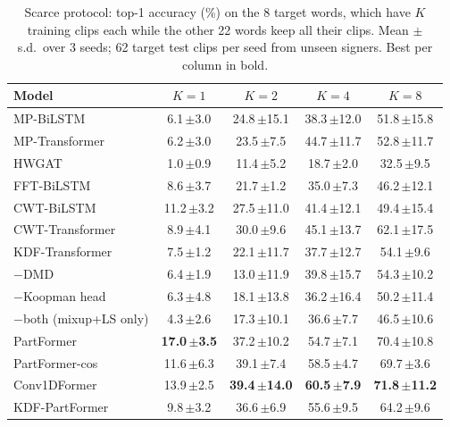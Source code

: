 \begin{table}[t]
\centering
\small
\caption{Scarce protocol: top-1 accuracy (\%) on the 8 target words, which have $K$ training clips each while the other 22 words keep all their clips. Mean $\pm$ s.d.\ over 3 seeds; 62 target test clips per seed from unseen signers. Best per column in bold.}
\label{tab:scarce}
\begin{tabular}{lcccc}
\toprule
Model & $K=1$ & $K=2$ & $K=4$ & $K=8$ \\
\midrule
MP-BiLSTM & 6.1\,{\scriptsize$\pm$3.0} & 24.8\,{\scriptsize$\pm$15.1} & 38.3\,{\scriptsize$\pm$12.0} & 51.8\,{\scriptsize$\pm$15.8} \\
MP-Transformer & 6.2\,{\scriptsize$\pm$3.0} & 23.5\,{\scriptsize$\pm$7.5} & 44.7\,{\scriptsize$\pm$11.7} & 52.8\,{\scriptsize$\pm$11.7} \\
\midrule
HWGAT & 1.0\,{\scriptsize$\pm$0.9} & 11.4\,{\scriptsize$\pm$5.2} & 18.7\,{\scriptsize$\pm$2.0} & 32.5\,{\scriptsize$\pm$9.5} \\
\midrule
FFT-BiLSTM & 8.6\,{\scriptsize$\pm$3.7} & 21.7\,{\scriptsize$\pm$1.2} & 35.0\,{\scriptsize$\pm$7.3} & 46.2\,{\scriptsize$\pm$12.1} \\
CWT-BiLSTM & 11.2\,{\scriptsize$\pm$3.2} & 27.5\,{\scriptsize$\pm$11.0} & 41.4\,{\scriptsize$\pm$12.1} & 49.4\,{\scriptsize$\pm$15.4} \\
CWT-Transformer & 8.9\,{\scriptsize$\pm$4.1} & 30.0\,{\scriptsize$\pm$9.6} & 45.1\,{\scriptsize$\pm$13.7} & 62.1\,{\scriptsize$\pm$17.5} \\
\midrule
KDF-Transformer & 7.5\,{\scriptsize$\pm$1.2} & 22.1\,{\scriptsize$\pm$11.7} & 37.7\,{\scriptsize$\pm$12.7} & 54.1\,{\scriptsize$\pm$9.6} \\
\quad $-$DMD & 6.4\,{\scriptsize$\pm$1.9} & 13.0\,{\scriptsize$\pm$11.9} & 39.8\,{\scriptsize$\pm$15.7} & 54.3\,{\scriptsize$\pm$10.2} \\
\quad $-$Koopman head & 6.3\,{\scriptsize$\pm$4.8} & 18.1\,{\scriptsize$\pm$13.8} & 36.2\,{\scriptsize$\pm$16.4} & 50.2\,{\scriptsize$\pm$11.4} \\
\quad $-$both (mixup+LS only) & 4.3\,{\scriptsize$\pm$2.6} & 17.3\,{\scriptsize$\pm$10.1} & 36.6\,{\scriptsize$\pm$7.7} & 46.5\,{\scriptsize$\pm$10.6} \\
\midrule
PartFormer & \textbf{17.0\,{\scriptsize$\pm$3.5}} & 37.2\,{\scriptsize$\pm$10.2} & 54.7\,{\scriptsize$\pm$7.1} & 70.4\,{\scriptsize$\pm$10.8} \\
PartFormer-cos & 11.6\,{\scriptsize$\pm$6.3} & 39.1\,{\scriptsize$\pm$7.4} & 58.5\,{\scriptsize$\pm$4.7} & 69.7\,{\scriptsize$\pm$3.6} \\
Conv1DFormer & 13.9\,{\scriptsize$\pm$2.5} & \textbf{39.4\,{\scriptsize$\pm$14.0}} & \textbf{60.5\,{\scriptsize$\pm$7.9}} & \textbf{71.8\,{\scriptsize$\pm$11.2}} \\
KDF-PartFormer & 9.8\,{\scriptsize$\pm$3.2} & 36.6\,{\scriptsize$\pm$6.9} & 55.6\,{\scriptsize$\pm$9.5} & 64.2\,{\scriptsize$\pm$9.6} \\
\bottomrule
\end{tabular}
\end{table}
